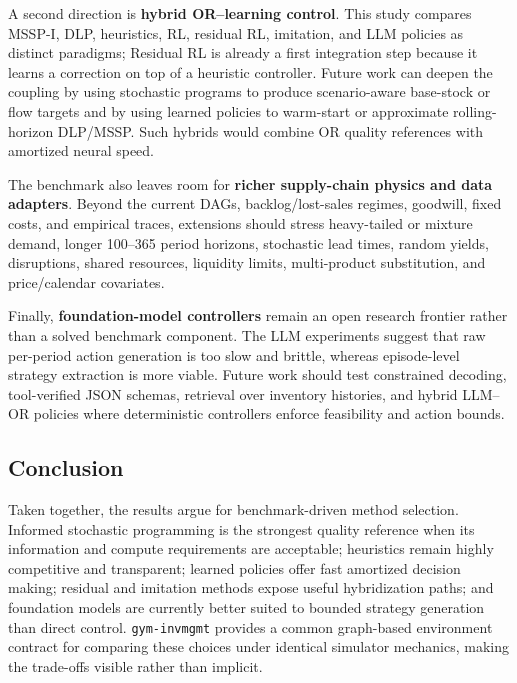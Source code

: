 \documentclass[10pt,a4paper]{article}
\begin{document}
A second direction is \textbf{hybrid OR--learning control}. This study
compares MSSP-I, DLP, heuristics, RL, residual RL, imitation, and LLM
policies as distinct paradigms; Residual RL is already a first integration
step because it learns a correction on top of a heuristic controller.
Future work can deepen the coupling by using stochastic programs to
produce scenario-aware base-stock or flow targets and by using learned
policies to warm-start or approximate rolling-horizon DLP/MSSP. Such
hybrids would combine OR quality references with amortized neural speed.

The benchmark also leaves room for \textbf{richer supply-chain physics and
data adapters}. Beyond the current DAGs, backlog/lost-sales regimes,
goodwill, fixed costs, and empirical traces, extensions should stress
heavy-tailed or mixture demand, longer 100--365 period horizons,
stochastic lead times, random yields, disruptions, shared resources,
liquidity limits, multi-product substitution, and price/calendar
covariates.

Finally, \textbf{foundation-model controllers} remain an open research
frontier rather than a solved benchmark component. The LLM experiments
suggest that raw per-period action generation is too slow and brittle,
whereas episode-level strategy extraction is more viable. Future work
should test constrained decoding, tool-verified JSON schemas, retrieval
over inventory histories, and hybrid LLM--OR policies where deterministic
controllers enforce feasibility and action bounds.

\subsection{Conclusion}

Taken together, the results argue for benchmark-driven method
selection. Informed stochastic programming is the strongest quality
reference when its information and compute requirements are acceptable;
heuristics remain highly competitive and transparent; learned policies
offer fast amortized decision making; residual and imitation methods
expose useful hybridization paths; and foundation models are currently
better suited to bounded strategy generation than direct control.
\texttt{gym-invmgmt} provides a common graph-based environment contract
for comparing these choices under identical simulator mechanics, making
the trade-offs visible rather than implicit.

\end{document}
